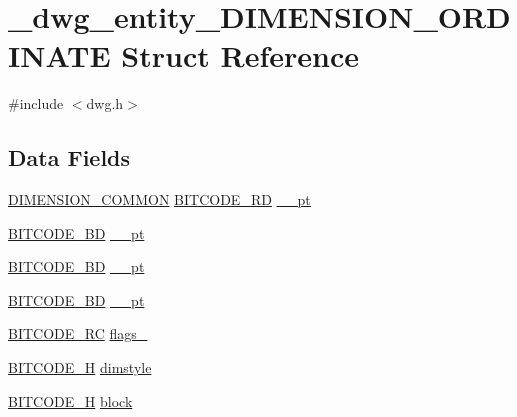 \hypertarget{struct__dwg__entity__DIMENSION__ORDINATE}{\section{\-\_\-dwg\-\_\-entity\-\_\-\-D\-I\-M\-E\-N\-S\-I\-O\-N\-\_\-\-O\-R\-D\-I\-N\-A\-T\-E \-Struct \-Reference}
\label{struct__dwg__entity__DIMENSION__ORDINATE}
}


{\ttfamily \#include $<$dwg.\-h$>$}

\subsection*{\-Data \-Fields}
\begin{DoxyCompactItemize}
\item 
\hyperlink{dwg_8h_a334d626d7e4a0a1af39036446dfa82c4}{\-D\-I\-M\-E\-N\-S\-I\-O\-N\-\_\-\-C\-O\-M\-M\-O\-N} \hyperlink{dwg_8h_a1d23a9bc9a02453876b244dc6706f6a6}{\-B\-I\-T\-C\-O\-D\-E\-\_\-R\-D} \hyperlink{struct__dwg__entity__DIMENSION__ORDINATE_aa17f60d88dcc97e4985d753491f0ffe6}{\-\_\-\_\-pt}
\item 
\hyperlink{dwg_8h_a00698ef1bb072aa0a9360c6fc1c57587}{\-B\-I\-T\-C\-O\-D\-E\-\_\-B\-D} \hyperlink{struct__dwg__entity__DIMENSION__ORDINATE_af44e6699c4ff685c4edfddb12a006686}{\-\_\-\_\-pt}
\item 
\hyperlink{dwg_8h_a00698ef1bb072aa0a9360c6fc1c57587}{\-B\-I\-T\-C\-O\-D\-E\-\_\-B\-D} \hyperlink{struct__dwg__entity__DIMENSION__ORDINATE_acae4c8958cfbdd84958c99e83d5cabb5}{\-\_\-\_\-pt}
\item 
\hyperlink{dwg_8h_a00698ef1bb072aa0a9360c6fc1c57587}{\-B\-I\-T\-C\-O\-D\-E\-\_\-B\-D} \hyperlink{struct__dwg__entity__DIMENSION__ORDINATE_a0eb2f581313e721cbbdb911d86a28479}{\-\_\-\_\-pt}
\item 
\hyperlink{dwg_8h_a7fd199a8f9c9cc52bdab220f65a2a619}{\-B\-I\-T\-C\-O\-D\-E\-\_\-\-R\-C} \hyperlink{struct__dwg__entity__DIMENSION__ORDINATE_ae784368fb8f40973c8fd0e6a713c4943}{flags\-\_}
\item 
\hyperlink{dwg_8h_a7c700e94e047a97ba8c24bdfe4029dc3}{\-B\-I\-T\-C\-O\-D\-E\-\_\-\-H} \hyperlink{struct__dwg__entity__DIMENSION__ORDINATE_a16f875d32c7dc3a775b0f36565f1b6b8}{dimstyle}
\item 
\hyperlink{dwg_8h_a7c700e94e047a97ba8c24bdfe4029dc3}{\-B\-I\-T\-C\-O\-D\-E\-\_\-\-H} \hyperlink{struct__dwg__entity__DIMENSION__ORDINATE_ad666f2f09bf898087068977c58965a79}{block}
\end{DoxyCompactItemize}


